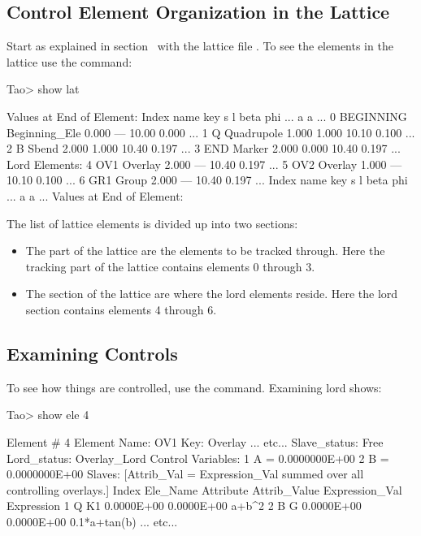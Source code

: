 \documentclass{hitec}
\begin{document}
\newpage

\subsection{Control Element Organization in the Lattice}

Start \tao as explained in section~ with the lattice file . To
see the elements in the lattice use the  command:
\begin{code}
Tao> show lat

      Values at End of Element:
 Index  name      key                       s       l    beta     phi ...
                                                            a       a ...
     0  BEGINNING Beginning_Ele         0.000     ---   10.00   0.000 ...
     1  Q         Quadrupole            1.000   1.000   10.10   0.100 ...
     2  B         Sbend                 2.000   1.000   10.40   0.197 ...
     3  END       Marker                2.000   0.000   10.40   0.197 ...
Lord Elements:
     4  OV1       Overlay               2.000     ---   10.40   0.197 ...
     5  OV2       Overlay               1.000     ---   10.10   0.100 ...
     6  GR1       Group                 2.000     ---   10.40   0.197 ...
 Index  name      key                       s       l    beta     phi ...
                                                            a       a ...
      Values at End of Element:
\end{code}

The list of lattice elements is divided up into two sections:
\begin{itemize}
\item
The  part of the lattice are the elements to be tracked through. Here the tracking part of
the lattice contains elements 0 through 3.
\item
The  section of the lattice are where the lord elements reside.  Here the lord section contains
elements 4 through 6.
\end{itemize}

\subsection{Examining Controls}

To see how things are controlled, use the  command. Examining lord  shows:
\begin{code}
Tao> show ele 4

 Element #                4
 Element Name: OV1
 Key: Overlay
... etc...
Slave_status: Free
Lord_status:  Overlay_Lord
Control Variables:
    1   A                                         =  0.0000000E+00
    2   B                                         =  0.0000000E+00
Slaves: [Attrib_Val = Expression_Val summed over all controlling overlays.]
   Index   Ele_Name  Attribute   Attrib_Value  Expression_Val    Expression
       1   Q         K1            0.0000E+00      0.0000E+00    a+b^2
       2   B         G             0.0000E+00      0.0000E+00    0.1*a+tan(b)
... etc...
\end{code}
\end{document}
